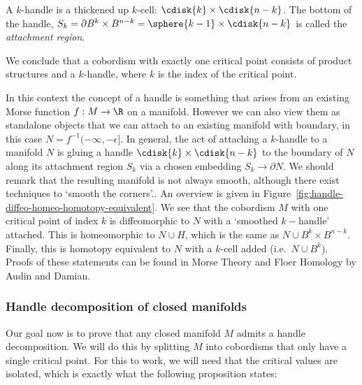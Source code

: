 \begin{itemize}
\begin{definition}[$k$-handle]
    A $k$-handle is a thickened up $k$-cell: $\cdisk{k} \times \cdisk{n-k}$.
    The bottom of the handle, $S_k = \partial B^{k} \times B^{n-k} = \sphere{k-1} \times \cdisk{n-k}$ is called the \emph{attachment region}.
    \end{definition}
\end{itemize}

We conclude that a cobordism with exactly one critical point consists of product structures and a $k$-handle, where $k$ is the index of the critical point.

    In this context the concept of a handle is something that arises from an existing Morse function $f:M \to  \R$ on a manifold.
    However we can also view them as standalone objects that we can attach to an existing manifold with boundary, in this case $N = f^{-1}(-\infty, -\epsilon]$.
    In general, the act of attaching a $k$-handle to a manifold $N$ is gluing a handle $\cdisk{k} \times \cdisk{n-k}$ to the boundary of $N$ along its attachment region $S_k$ via a chosen embedding $S_k \to  \partial N$.
    We should remark that the resulting manifold is not always smooth, although there exist techniques to `smooth the corners'..
    An overview is given in Figure~\ref{fig:handle-diffeo-homeo-homotopy-equivalent}.
    We see that the cobordism $M$ with one critical point of index $k$ is diffeomorphic to $N$ with a `smoothed $k-$handle' attached.
    This is homeomorphic to $N \cup H$, which is the same as $N \cup B^{k} \times B^{n-k}$.
    Finally, this is homotopy equivalent to $N$ with a $k$-cell added (i.e.\ $N \cup B^{k}$).
    Proofs of these statements can be found in Morse Theory and Floer Homology by Audin and Damian.

\begin{figure}[H]
    \centering
\end{figure}

\subsubsection*{Handle decomposition of closed manifolds}

Our goal now is to prove that any closed manifold $M$ admits a handle decomposition.
We will do this by splitting $M$ into cobordisms that only have a single critical point.
For this to work, we will need that the critical values are isolated, which is exactly what the following proposition states:

